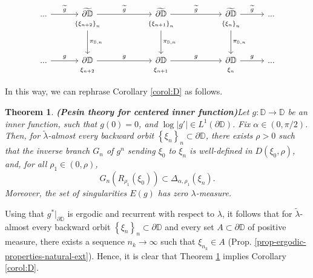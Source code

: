 \documentclass[11pt]{article}
\newtheorem{thm}{Theorem}[section]
\theoremstyle{definition}
\theoremstyle{remark}
\theoremstyle{plain}
\begin{document}
\[\begin{tikzcd}[row sep=-0.2em,/tikz/row 3/.style={row sep=4em}]
	...\arrow{r}{\widetilde{g}} &	\widetilde{\partial \mathbb{D}} \arrow{rr}{\widetilde{g}} & &	\widetilde{\partial \mathbb{D}} \arrow{rr}{\widetilde{g}} & &	\widetilde{\partial \mathbb{D}}\arrow{r}{\widetilde{g}} &...\\ 
	&	{\scriptstyle \left\lbrace \xi_{n+2}\right\rbrace _n} \arrow{ddddddd}{\pi_{\mathbb{D},n}}& &{\scriptstyle \left\lbrace \xi_{n+1}\right\rbrace _n} \arrow{ddddddd}{\pi_{\mathbb{D},n}}& &	{\scriptstyle \left\lbrace \xi_{n}\right\rbrace _n }\arrow{ddddddd}{\pi_{\mathbb{D},n}} \\ \\ \\	\\ \\ \\ \\...\arrow{r}{g} &\partial \mathbb{D}\arrow{rr}{g}  &&
	\partial \mathbb{D} \arrow{rr}{g}  && \partial \mathbb{D}\arrow{r}{g} &...\\ &{\scriptstyle \xi_{n+2} }&&{\scriptstyle \xi_{n+1} }&&{\scriptstyle \xi_n}
\end{tikzcd}
\]

In this way, we can rephrase Corollary \ref{corol:D} as follows.
\begin{thm}{\bf (Pesin theory for centered inner function)}\label{thm-pesin-inner}
	Let $ g\colon\mathbb{D}\to\mathbb{D} $ be an inner function, such that $ g(0)=0 $, and $ \log \left| g'\right|\in L^1(\partial\mathbb{D})$. Fix $ \alpha\in (0,\pi/2) $.  Then, for $ \widetilde{\lambda }$-almost every backward orbit $ \left\lbrace \xi_n\right\rbrace_n \subset \partial\mathbb{D}$, there exists $ \rho >0 $ such that
	the inverse branch $ G_n $ of $ g^n $ sending $\xi_0 $ to $ \xi_n $ is well-defined in $ D(\xi_0,\rho) $, and, for all $ \rho_1\in (0, \rho) $, \[ G_n(R_{\rho_1}(\xi_0))\subset \Delta_{\alpha, \rho_1}(\xi_n).\]
	Moreover, the set of singularities $ E(g) $ has zero $ \lambda $-measure.
\end{thm}

Using that $ g^*|_{\partial\mathbb{D}} $ is ergodic and recurrent with respect to $ \lambda  $, it follows that for $ \widetilde{\lambda }$-almost every backward orbit $ \left\lbrace \xi_n\right\rbrace_n \subset \partial\mathbb{D}$ and every set $ A\subset\partial\mathbb{D} $ of positive measure, there exists  a sequence $ n_k\to\infty $ such that $ \xi_{n_k}\in A $ (Prop. \ref{prop-ergodic-properties-natural-ext}). Hence, it is clear that Theorem \ref{thm-pesin-inner} implies Corollary \ref{corol:D}.
\end{document}
